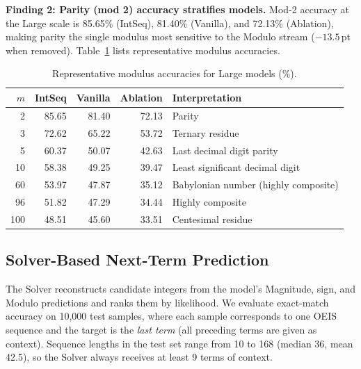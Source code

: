 \textbf{Finding 2: Parity (mod 2) accuracy stratifies models.}
Mod-2 accuracy at the Large scale is 85.65\% (IntSeq), 81.40\% (Vanilla), and 72.13\%
(Ablation), making parity the single modulus most sensitive to the Modulo stream ($-13.5$\,pt
when removed). Table~\ref{tab:moduli} lists representative modulus accuracies.

\begin{table}[t]
\caption{Representative modulus accuracies for Large models (\%).}
\label{tab:moduli}
\centering
\begin{tabular}{rrrrl}
\hline
$m$ & IntSeq & Vanilla & Ablation & Interpretation \\
\hline
  2 & 85.65  & 81.40   & 72.13    & Parity \\
  3 & 72.62  & 65.22   & 53.72    & Ternary residue \\
  5 & 60.37  & 50.07   & 42.63    & Last decimal digit parity \\
 10 & 58.38  & 49.25   & 39.47    & Least significant decimal digit \\
 60 & 53.97  & 47.87   & 35.12    & Babylonian number (highly composite) \\
 96 & 51.82  & 47.29   & 34.44    & Highly composite \\
100 & 48.51  & 45.60   & 33.51    & Centesimal residue \\
\hline
\end{tabular}
\end{table}

\subsection{Solver-Based Next-Term Prediction}
\label{sec:solver-eval}

The Solver reconstructs candidate integers from the model's Magnitude, sign, and Modulo
predictions and ranks them by likelihood. We evaluate exact-match accuracy on 10,000 test
samples, where each sample corresponds to one OEIS sequence and the target is the \emph{last
term} (all preceding terms are given as context). Sequence lengths in the test set range from
10 to 168 (median 36, mean 42.5), so the Solver always receives at least 9 terms of context.

